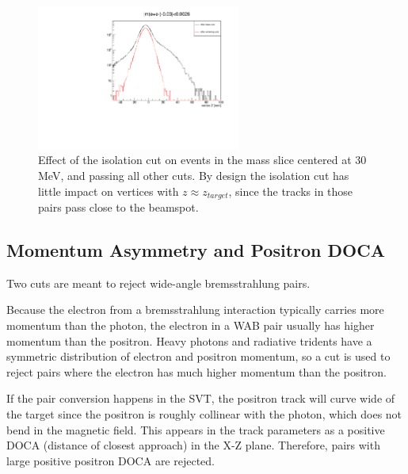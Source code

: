\begin{figure}[ht]
\begin{center}
    \includegraphics[width=0.6\textwidth,page=5,angle=-90]{vertexing/figs/vertcutplots}
\end{center}
    \caption{Effect of the isolation cut on events in the mass slice centered at 30 MeV, and passing all other cuts.
    By design the isolation cut has little impact on vertices with $z\approx z_{target}$, since the tracks in those pairs pass close to the beamspot.
    }
    \label{fig:isolation_performance}
\end{figure}

\subsection{Momentum Asymmetry and Positron DOCA}
Two cuts are meant to reject wide-angle bremsstrahlung pairs.

Because the electron from a bremsstrahlung interaction typically carries more momentum than the photon, the electron in a WAB pair usually has higher momentum than the positron.
Heavy photons and radiative tridents have a symmetric distribution of electron and positron momentum, so a cut is used to reject pairs where the electron has much higher momentum than the positron.

If the pair conversion happens in the SVT, the positron track will curve wide of the target since the positron is roughly collinear with the photon, which does not bend in the magnetic field.
This appears in the track parameters as a positive DOCA (distance of closest approach) in the X-Z plane.
Therefore, pairs with large positive positron DOCA are rejected.

